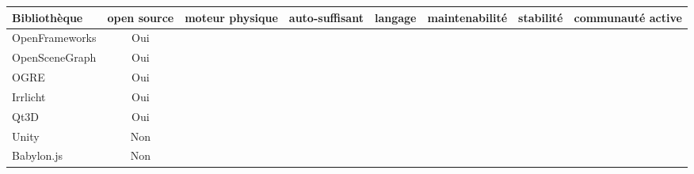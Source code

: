 \newpage
\begin{landscape}
\hspace{-2cm} 
\begin{tabular}{l|c|c|c|c|c|c|c}
Bibliothèque & open source & moteur physique & auto-suffisant & langage & maintenabilité & stabilité & communauté active\\
\hline
OpenFrameworks & Oui & & &  & & \\
OpenSceneGraph & Oui & & &  & & \\ 
OGRE & Oui & &  & & &\\
Irrlicht & Oui & &  & & &\\
Qt3D & Oui & &  & & &\\
Unity & Non &  & & & &\\
Babylon.js  & Non & & & & & \\
\end{tabular}
\end{landscape}
